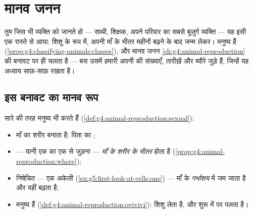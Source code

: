 \chapter{मानव जनन}\label{ch:g5:human-reproduction}

तुम जिस भी व्यक्ति को जानते हो --- साथी, शिक्षक, अपने परिवार का सबसे
बुज़ुर्ग व्यक्ति --- वह इसी एक रास्ते से आया: शिशु के रूप में, अपनी माँ
के भीतर महीनों बढ़ने के बाद जन्म लेकर। मनुष्य  हैं
(\cref{prop:g4:classifying-animals:classes}), और मानव जनन
\cref{ch:g4:animal-reproduction} की  बनावट पर ही चलता है ---
बस उसमें हमारी अपनी  की संख्याएँ, तारीख़ें और ब्यौरे जुड़े हैं,
जिन्हें यह अध्याय साफ़-साफ़ रखता है।

\section{इस बनावट का मानव रूप}

\begin{proposition}\label{prop:g5:human-reproduction:plan}
सारे  की तरह मनुष्य भी  करते हैं
(\cref{def:g4:animal-reproduction:sexual}):
\begin{itemize}
  \item माँ का शरीर \emph{} बनाता है; पिता का
        \emph{};
  \item {} --- यानी एक  का एक  से जुड़ना ---
        \emph{माँ के शरीर के भीतर} होता है
        (\cref{prop:g4:animal-reproduction:where});
  \item निषेचित  --- एक अकेली 
        (\cref{ex:g5:first-look-at-cells:one}) --- माँ के
        \emph{गर्भाशय} में जम जाता है और वहीं बढ़ता है;
  \item मनुष्य  हैं
        (\cref{def:g4:animal-reproduction:ovivivi}): शिशु 
        लेता है, और शुरू में  पर पलता है।
\end{itemize}
\end{proposition}
\admitted

